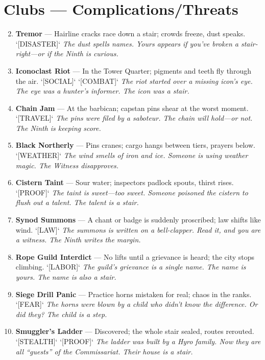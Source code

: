 \section*{Clubs --- Complications/Threats}
\label{sec:thepyrgos-complications}
\begin{enumerate}
\setcounter{enumi}{1}
\item \textbf{Tremor} --- Hairline cracks race down a stair; crowds freeze, dust speaks. `[DISASTER]`
  \hfill \textit{The dust spells names. Yours appears if you've broken a stair-right---or if the Ninth is curious.}
\item \textbf{Iconoclast Riot} --- In the Tower Quarter; pigments and teeth fly through the air. `[SOCIAL]` `[COMBAT]`
  \hfill \textit{The riot started over a missing icon's eye. The eye was a hunter's informer. The icon was a stair.}
\item \textbf{Chain Jam} --- At the barbican; capstan pins shear at the worst moment. `[TRAVEL]`
  \hfill \textit{The pins were filed by a saboteur. The chain will hold---or not. The Ninth is keeping score.}
\item \textbf{Black Northerly} --- Pins cranes; cargo hangs between tiers, prayers below. `[WEATHER]`
  \hfill \textit{The wind smells of iron and ice. Someone is using weather magic. The Witness disapproves.}
\item \textbf{Cistern Taint} --- Sour water; inspectors padlock spouts, thirst rises. `[PROOF]`
  \hfill \textit{The taint is sweet---too sweet. Someone poisoned the cistern to flush out a talent. The talent is a stair.}
\item \textbf{Synod Summons} --- A chant or badge is suddenly proscribed; law shifts like wind. `[LAW]`
  \hfill \textit{The summons is written on a bell-clapper. Read it, and you are a witness. The Ninth writes the margin.}
\item \textbf{Rope Guild Interdict} --- No lifts until a grievance is heard; the city stops climbing. `[LABOR]`
  \hfill \textit{The guild's grievance is a single name. The name is yours. The name is also a stair.}
\item \textbf{Siege Drill Panic} --- Practice horns mistaken for real; chaos in the ranks. `[FEAR]`
  \hfill \textit{The horns were blown by a child who didn't know the difference. Or did they? The child is a step.}
\item \textbf{Smuggler's Ladder} --- Discovered; the whole stair sealed, routes rerouted. `[STEALTH]` `[PROOF]`
  \hfill \textit{The ladder was built by a Hyro family. Now they are all ``guests'' of the Commissariat. Their house is a stair.}

\end{enumerate}
